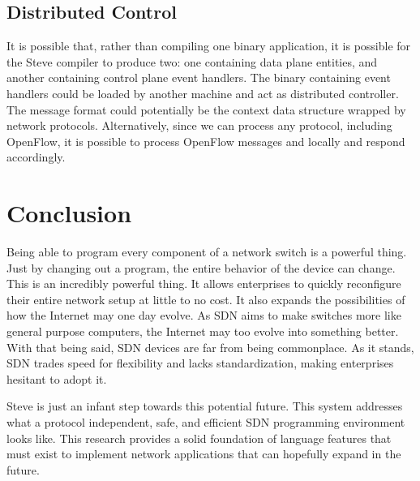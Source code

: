 \subsection{Distributed Control}

It is possible that, rather than compiling one binary application, it is possible for the Steve compiler to produce two: one containing data plane entities, and another containing control plane event handlers. The binary containing event handlers could be loaded by another machine and act as distributed controller. The message format could potentially be the context data structure wrapped by network protocols. Alternatively, since we can process any protocol, including OpenFlow, it is possible to process OpenFlow messages and locally and respond accordingly.


\section{Conclusion}

Being able to program every component of a network switch is a powerful thing. Just by changing out a program, the entire behavior of the device can change. This is an incredibly powerful thing. It allows enterprises to quickly reconfigure their entire network setup at little to no cost. It also expands the possibilities of how the Internet may one day evolve. As SDN aims to make switches more like general purpose computers, the Internet may too evolve into something better.
With that being said, SDN devices are far from being commonplace. As it stands, SDN trades speed for flexibility and lacks standardization, making enterprises hesitant to adopt it. 

Steve is just an infant step towards this potential future. This system addresses what a protocol independent, safe, and efficient SDN programming environment looks like. This research provides a solid foundation of language features that must exist to implement network applications that can hopefully expand in the future.